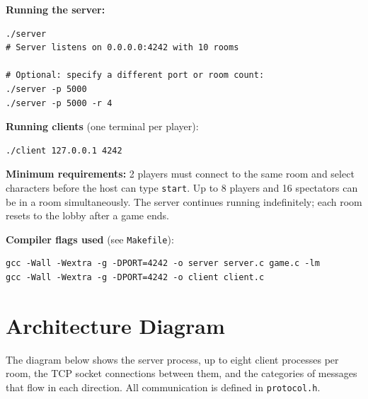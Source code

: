 \documentclass[11pt,letterpaper]{article}
\begin{document}
\textbf{Running the server:}
\begin{lstlisting}
./server
# Server listens on 0.0.0.0:4242 with 10 rooms

# Optional: specify a different port or room count:
./server -p 5000
./server -p 5000 -r 4
\end{lstlisting}

\textbf{Running clients} (one terminal per player):
\begin{lstlisting}
./client 127.0.0.1 4242
\end{lstlisting}

\textbf{Minimum requirements:} 2 players must connect to the same room and select characters before the host can type \texttt{start}. Up to 8 players and 16 spectators can be in a room simultaneously. The server continues running indefinitely; each room resets to the lobby after a game ends.

\textbf{Compiler flags used} (see \texttt{Makefile}):
\begin{lstlisting}
gcc -Wall -Wextra -g -DPORT=4242 -o server server.c game.c -lm
gcc -Wall -Wextra -g -DPORT=4242 -o client client.c
\end{lstlisting}
\newpage
\section{Architecture Diagram}

The diagram below shows the server process, up to eight client processes per room, the TCP socket connections between them, and the categories of messages that flow in each direction. All communication is defined in \texttt{protocol.h}.
\end{document}
